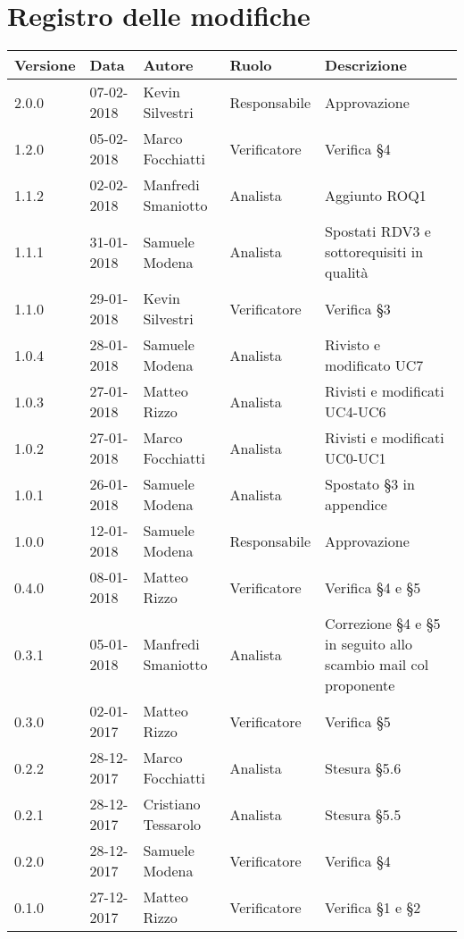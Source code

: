 \documentclass[./AnalisideiRequisiti.tex]{subfiles}
\begin{document}
	
{
	\chapter*{Registro delle modifiche}
\setlength\LTleft{-22mm}
	\begin{longtable}{|p{20mm}|p{20mm}|p{40mm}|p{30mm}|p{50mm}|}
		\hline
		\textbf{Versione} & \textbf{Data} & \textbf{Autore} & \textbf{Ruolo} & \textbf{Descrizione} \\ \hline 
		2.0.0 & 07-02-2018 & Kevin Silvestri & Responsabile & Approvazione\\ \hline 
		1.2.0 & 05-02-2018 & Marco Focchiatti & Verificatore & Verifica §4\\ \hline    
		1.1.2 & 02-02-2018 & Manfredi Smaniotto & Analista & Aggiunto ROQ1\\ \hline 
		1.1.1 & 31-01-2018 & Samuele Modena & Analista & Spostati RDV3 e sottorequisiti in qualità\\ \hline  
		1.1.0 & 29-01-2018 & Kevin Silvestri & Verificatore & Verifica §3\\ \hline  
		1.0.4 & 28-01-2018 & Samuele Modena & Analista & Rivisto e modificato UC7\\ \hline  
		1.0.3 & 27-01-2018 & Matteo Rizzo & Analista & Rivisti e modificati UC4-UC6\\ \hline    
		1.0.2 & 27-01-2018 & Marco Focchiatti & Analista & Rivisti e modificati UC0-UC1\\ \hline  
		1.0.1 & 26-01-2018 & Samuele Modena & Analista & Spostato §3 in appendice\\ \hline
		1.0.0 & 12-01-2018 & Samuele Modena & Responsabile & Approvazione\\ \hline
		0.4.0 & 08-01-2018 & Matteo Rizzo & Verificatore & Verifica §4 e §5\\ \hline
		0.3.1 & 05-01-2018 & Manfredi Smaniotto & Analista & Correzione §4 e §5 in seguito allo scambio mail col proponente \\ \hline		
		0.3.0 & 02-01-2017 & Matteo Rizzo & Verificatore & Verifica §5\\ \hline
		0.2.2 & 28-12-2017 & Marco Focchiatti & Analista & Stesura §5.6\\ \hline	
		0.2.1 & 28-12-2017 & Cristiano Tessarolo & Analista & Stesura §5.5\\ \hline
	   	0.2.0 & 28-12-2017 & Samuele Modena & Verificatore & Verifica §4\\ \hline
	   	0.1.0 & 27-12-2017 & Matteo Rizzo & Verificatore & Verifica §1 e §2  \\ \hline		

\end{longtable}}
\end{document}
